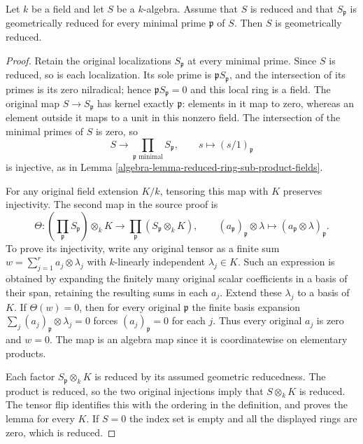 \begin{lemma}
\label{editorial-source-lemma-generic-points-geometrically-reduced}
Let $k$ be a field and let $S$ be a $k$-algebra. Assume that
$S$ is reduced and that $S_{\mathfrak p}$ is geometrically
reduced for every minimal prime $\mathfrak p$ of $S$.
Then $S$ is geometrically reduced.
\end{lemma}

\begin{proof}
Retain the original localizations $S_{\mathfrak p}$
at every minimal prime. Since $S$ is reduced,
so is each localization. Its sole prime is
$\mathfrak pS_{\mathfrak p}$, and the intersection
of its primes is its zero nilradical; hence
$\mathfrak pS_{\mathfrak p}=0$ and this local
ring is a field. The original map
$S\to S_{\mathfrak p}$ has kernel exactly
$\mathfrak p$: elements in it map to zero,
whereas an element outside it maps to a unit
in this nonzero field. The intersection of
the minimal primes of $S$ is zero, so
$$
S\longrightarrow\prod_{\mathfrak p\text{ minimal}}S_{\mathfrak p},
\qquad s\longmapsto(s/1)_{\mathfrak p}
$$
is injective, as in
Lemma \ref{algebra-lemma-reduced-ring-sub-product-fields}.

For any original field extension $K/k$, tensoring
this map with $K$ preserves injectivity. The
second map in the source proof is
$$
\Theta:\left(\prod_{\mathfrak p}S_{\mathfrak p}\right)\otimes_kK
\longrightarrow\prod_{\mathfrak p}(S_{\mathfrak p}\otimes_kK),
\qquad (a_{\mathfrak p})_{\mathfrak p}\otimes\lambda
\longmapsto(a_{\mathfrak p}\otimes\lambda)_{\mathfrak p}.
$$
To prove its injectivity, write any original
tensor as a finite sum
$w=\sum_{j=1}^r a_j\otimes\lambda_j$ with
$k$-linearly independent $\lambda_j\in K$.
Such an expression is obtained by expanding
the finitely many original scalar coefficients
in a basis of their span, retaining the
resulting sums in each $a_j$.
Extend these $\lambda_j$ to a basis of $K$.
If $\Theta(w)=0$, then for every original
$\mathfrak p$ the finite basis expansion
$\sum_j(a_j)_{\mathfrak p}\otimes\lambda_j=0$
forces $(a_j)_{\mathfrak p}=0$ for each $j$.
Thus every original $a_j$ is zero and $w=0$.
The map is an algebra map since it is
coordinatewise on elementary products.

Each factor $S_{\mathfrak p}\otimes_kK$ is
reduced by its assumed geometric reducedness.
The product is reduced, so the two original
injections imply that $S\otimes_kK$ is reduced.
The tensor flip identifies this with the
ordering in the definition, and proves the
lemma for every $K$. If $S=0$ the index set
is empty and all the displayed rings are
zero, which is reduced.


\end{proof}
